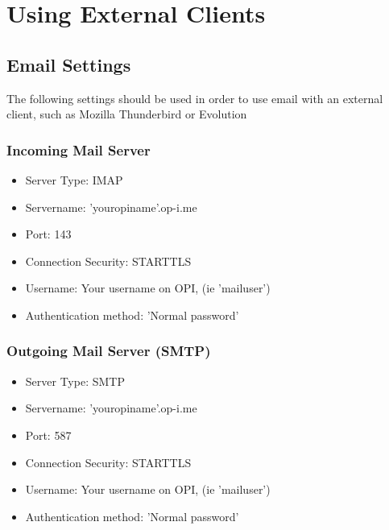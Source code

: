 \documentclass[12pt,a4paper,titlepage]{article}
\begin{document}
\newpage
\section{Using External Clients}
\subsection{Email Settings}
The following settings should be used in order to use email with an external client, such as Mozilla Thunderbird or Evolution

\subsubsection{Incoming Mail Server}
\begin{itemize}
\item Server Type: IMAP
\item Servername: 'youropiname'.op-i.me
\item Port: 143
\item Connection Security: STARTTLS
\item Username: Your username on OPI, (ie 'mailuser')
\item Authentication method: 'Normal password'
\end{itemize}

\subsubsection{Outgoing Mail Server (SMTP)}
\begin{itemize}
\item Server Type: SMTP
\item Servername: 'youropiname'.op-i.me
\item Port: 587
\item Connection Security: STARTTLS
\item Username: Your username on OPI, (ie 'mailuser')
\item Authentication method: 'Normal password'
\end{itemize}

\newpage
\end{document}
